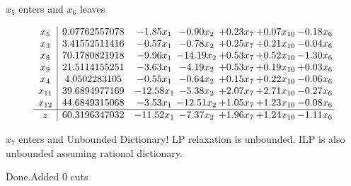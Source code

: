 \documentclass[8pt]{article}
\begin{document}
 $ x_{5} $ enters and $ x_{6} $ leaves 

 \[\begin{array}{c| c c@{\hskip 2pt} c@{\hskip 2pt} c@{\hskip 2pt} c@{\hskip 2pt} c@{\hskip 2pt} }
 x_{5}   &  9.07762557078 & -1.85 x_{1} & -0.90 x_{2} & +  0.23 x_{7} & +  0.07 x_{10} & -0.18 x_{6}\\
 x_{3}   &  3.41552511416 & -0.57 x_{1} & -0.78 x_{2} & +  0.25 x_{7} & +  0.21 x_{10} & -0.04 x_{6}\\
 x_{8}   &  70.1780821918 & -9.96 x_{1} & -14.19 x_{2} & +  0.53 x_{7} & +  0.52 x_{10} & -1.30 x_{6}\\
 x_{9}   &  21.5114155251 & -3.63 x_{1} & -4.19 x_{2} & +  0.53 x_{7} & +  0.19 x_{10} & +  0.03 x_{6}\\
 x_{4}   &  4.0502283105 & -0.55 x_{1} & -0.64 x_{2} & +  0.15 x_{7} & +  0.22 x_{10} & -0.06 x_{6}\\
 x_{11}   &  39.6894977169 & -12.58 x_{1} & -5.38 x_{2} & +  2.07 x_{7} & +  2.71 x_{10} & -0.27 x_{6}\\
 x_{12}   &  44.6849315068 & -3.53 x_{1} & -12.51 x_{2} & +  1.05 x_{7} & +  1.23 x_{10} & -0.08 x_{6}\\
\hline
z    &  60.3196347032 & -11.52 x_{1} & -7.37 x_{2} & +  1.96 x_{7} & +  1.24 x_{10} & -1.11 x_{6}\\
\end{array}\]


 $ x_{7} $ enters and Unbounded Dictionary!
 LP relaxation is unbounded. ILP is also unbounded assuming rational dictionary. 

Done.Added 0 cuts 
\end{document}
